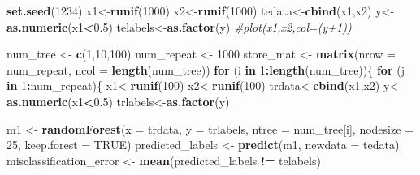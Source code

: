 \documentclass[
]{article}
\newenvironment{Shaded}{\begin{snugshade}}{\end{snugshade}}
\newcommand{\AttributeTok}[1]{\textcolor[rgb]{0.13,0.29,0.53}{#1}}
\newcommand{\CommentTok}[1]{\textcolor[rgb]{0.56,0.35,0.01}{\textit{#1}}}
\newcommand{\ConstantTok}[1]{\textcolor[rgb]{0.56,0.35,0.01}{#1}}
\newcommand{\ControlFlowTok}[1]{\textcolor[rgb]{0.13,0.29,0.53}{\textbf{#1}}}
\newcommand{\DecValTok}[1]{\textcolor[rgb]{0.00,0.00,0.81}{#1}}
\newcommand{\FloatTok}[1]{\textcolor[rgb]{0.00,0.00,0.81}{#1}}
\newcommand{\FunctionTok}[1]{\textcolor[rgb]{0.13,0.29,0.53}{\textbf{#1}}}
\newcommand{\NormalTok}[1]{#1}
\newcommand{\OtherTok}[1]{\textcolor[rgb]{0.56,0.35,0.01}{#1}}
\newcommand{\SpecialCharTok}[1]{\textcolor[rgb]{0.81,0.36,0.00}{\textbf{#1}}}
\begin{document}
\begin{Shaded}
\begin{Highlighting}[]
\FunctionTok{set.seed}\NormalTok{(}\DecValTok{1234}\NormalTok{)}
\NormalTok{x1}\OtherTok{\textless{}{-}}\FunctionTok{runif}\NormalTok{(}\DecValTok{1000}\NormalTok{)}
\NormalTok{x2}\OtherTok{\textless{}{-}}\FunctionTok{runif}\NormalTok{(}\DecValTok{1000}\NormalTok{)}
\NormalTok{tedata}\OtherTok{\textless{}{-}}\FunctionTok{cbind}\NormalTok{(x1,x2)}
\NormalTok{y}\OtherTok{\textless{}{-}}\FunctionTok{as.numeric}\NormalTok{(x1}\SpecialCharTok{\textless{}}\FloatTok{0.5}\NormalTok{)}
\NormalTok{telabels}\OtherTok{\textless{}{-}}\FunctionTok{as.factor}\NormalTok{(y)}
\CommentTok{\#plot(x1,x2,col=(y+1))}

\NormalTok{num\_tree }\OtherTok{\textless{}{-}} \FunctionTok{c}\NormalTok{(}\DecValTok{1}\NormalTok{,}\DecValTok{10}\NormalTok{,}\DecValTok{100}\NormalTok{)}
\NormalTok{num\_repeat }\OtherTok{\textless{}{-}} \DecValTok{1000}
\NormalTok{store\_mat }\OtherTok{\textless{}{-}} \FunctionTok{matrix}\NormalTok{(}\AttributeTok{nrow =}\NormalTok{ num\_repeat, }\AttributeTok{ncol =} \FunctionTok{length}\NormalTok{(num\_tree))}
\ControlFlowTok{for}\NormalTok{ (i }\ControlFlowTok{in} \DecValTok{1}\SpecialCharTok{:}\FunctionTok{length}\NormalTok{(num\_tree))\{}
  \ControlFlowTok{for}\NormalTok{ (j }\ControlFlowTok{in} \DecValTok{1}\SpecialCharTok{:}\NormalTok{num\_repeat)\{}
\NormalTok{    x1}\OtherTok{\textless{}{-}}\FunctionTok{runif}\NormalTok{(}\DecValTok{100}\NormalTok{)}
\NormalTok{    x2}\OtherTok{\textless{}{-}}\FunctionTok{runif}\NormalTok{(}\DecValTok{100}\NormalTok{)}
\NormalTok{    trdata}\OtherTok{\textless{}{-}}\FunctionTok{cbind}\NormalTok{(x1,x2)}
\NormalTok{    y}\OtherTok{\textless{}{-}}\FunctionTok{as.numeric}\NormalTok{(x1}\SpecialCharTok{\textless{}}\FloatTok{0.5}\NormalTok{)}
\NormalTok{    trlabels}\OtherTok{\textless{}{-}}\FunctionTok{as.factor}\NormalTok{(y)}
    
\NormalTok{    m1 }\OtherTok{\textless{}{-}} \FunctionTok{randomForest}\NormalTok{(}\AttributeTok{x =}\NormalTok{ trdata, }\AttributeTok{y =}\NormalTok{ trlabels, }\AttributeTok{ntree =}\NormalTok{ num\_tree[i], }\AttributeTok{nodesize =} \DecValTok{25}\NormalTok{, }\AttributeTok{keep.forest =} \ConstantTok{TRUE}\NormalTok{)}
\NormalTok{    predicted\_labels }\OtherTok{\textless{}{-}} \FunctionTok{predict}\NormalTok{(m1, }\AttributeTok{newdata =}\NormalTok{ tedata)}
\NormalTok{    misclassification\_error }\OtherTok{\textless{}{-}} \FunctionTok{mean}\NormalTok{(predicted\_labels }\SpecialCharTok{!=}\NormalTok{ telabels)}
    

\end{Highlighting}
\end{Shaded}
\end{document}
